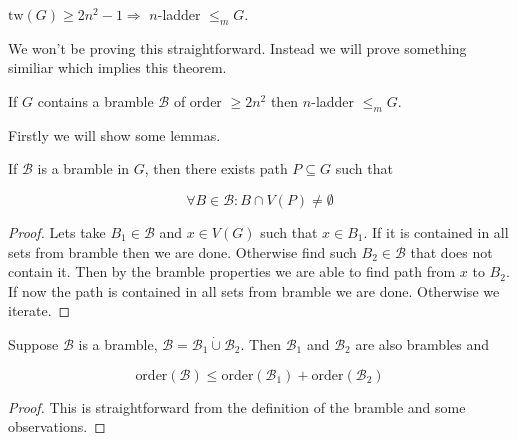 \begin{thm}
	$\text{tw}(G) \geq 2n^{2} - 1 \Rightarrow$ $n$-ladder $\leq_{m} G$.
\end{thm}

We won't be proving this straightforward. Instead we will prove something similiar which implies this theorem.

\begin{thm}
	If $G$ contains a bramble $\mathcal{B}$ of order $\geq 2n^2$ then $n$-ladder $\leq_{m} G$.
\end{thm}

Firstly we will show some lemmas.

\begin{lemma}
	If $\mathcal{B}$ is a bramble in $G$, then there exists path $P \subseteq G$ such that
	
	$$
	\forall B \in \mathcal{B} : B \cap V(P) \neq \emptyset
	$$
\end{lemma}

\begin{proof}
	Lets take $B_{1} \in \mathcal{B}$ and $x \in V(G)$ such that $x \in B_{1}$. If it is contained in all sets from bramble then we are done. Otherwise find such $B_{2} \in \mathcal{B}$ that does not contain it. Then by the bramble properties we are able to find path from $x$ to $B_{2}$. If now the path is contained in all sets from bramble we are done. Otherwise we iterate.
\end{proof}

\begin{lemma}
	Suppose $\mathcal{B}$ is a bramble, $\mathcal{B} = \mathcal{B}_{1} \dot \cup \mathcal{B}_{2}$. Then $\mathcal{B}_{1}$ and $\mathcal{B}_{2}$ are also brambles and
	
	$$
	\text{order}(\mathcal{B}) \leq \text{order}(\mathcal{B}_{1}) + \text{order}(\mathcal{B}_{2})
	$$
\end{lemma}

\begin{proof}
	This is straightforward from the definition of the bramble and some observations.
\end{proof}

